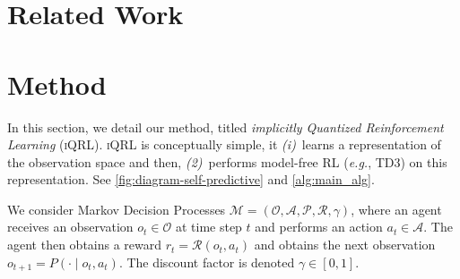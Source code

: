 \documentclass{article}
\makeatletter
\theoremstyle{plain}
\theoremstyle{definition}
\theoremstyle{remark}
\newcommand{\our}{\textsc{iQRL}\xspace}
\newcommand{\eg}{\textit{e.g.\@}\xspace}
\makeatother
\begin{document}
\section{Related Work}
\label{sec:related_work}



\section{Method}
\label{sec:method}

In this section, we detail our method, titled \textit{implicitly Quantized Reinforcement Learning} (\our).
\our is conceptually simple, it {\em (i)}~learns a representation of the observation space and then,
{\em (2)}~performs model-free RL (\eg, TD3) on this representation.
See \cref{fig:diagram-self-predictive} and \cref{alg:main_alg}.

We consider Markov Decision Processes \citep[MDPs,][]{bellmanMarkovianDecisionProcess1957a} $\mathcal{M} = (\mathcal{O}, \mathcal{A}, \mathcal{P}, \mathcal{R}, \gamma)$,
where an agent receives an observation $o_{t} \in \mathcal{O}$ at time step $t$ and performs an action $a_{t} \in \mathcal{A}$.
The agent then obtains a reward $r_{t} = \mathcal{R} (o_{t}, a_{t})$ and obtains the next observation
$o_{t+1} = P(\cdot \mid o_{t}, a_{t})$.
The discount factor is denoted $\gamma \in [0, 1]$.
\end{document}
